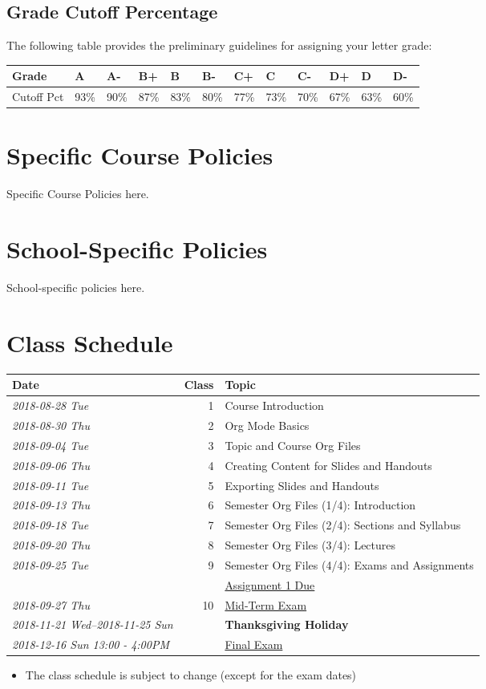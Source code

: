 \documentclass[article,letterpaper,times,10pt,listings-bw,microtype]{scrartcl}
\begin{document}
\subsection*{Grade Cutoff Percentage}
\label{sec:org087cdd8}
The following table provides the preliminary guidelines for assigning your
letter grade:

\begin{center}
\begin{tabular}{llllllllllll}
\hline
Grade & A & A- & B+ & B & B- & C+ & C & C- & D+ & D & D-\\
\hline
Cutoff Pct & 93\% & 90\% & 87\% & 83\% & 80\% & 77\% & 73\% & 70\% & 67\% & 63\% & 60\%\\
\hline
\end{tabular}
\end{center}
\section*{Specific Course Policies}
\label{sec:org88f7f98}
Specific Course Policies here.
\section*{School-Specific Policies}
\label{sec:org9fe0e92}
School-specific policies here.
\clearpage
\section*{Class Schedule}
\label{sec:org6cf35ec}
\begin{center}
\begin{tabular}{lrl}
Date & Class & Topic\\
\hline
\textit{2018-08-28 Tue} & 1 & Course Introduction\\
\textit{2018-08-30 Thu} & 2 & Org Mode Basics\\
\textit{2018-09-04 Tue} & 3 & Topic and Course Org Files\\
\textit{2018-09-06 Thu} & 4 & Creating Content for Slides and Handouts\\
\textit{2018-09-11 Tue} & 5 & Exporting Slides and Handouts\\
\textit{2018-09-13 Thu} & 6 & Semester Org Files (1/4): Introduction\\
\textit{2018-09-18 Tue} & 7 & Semester Org Files (2/4): Sections and Syllabus\\
\textit{2018-09-20 Thu} & 8 & Semester Org Files (3/4): Lectures\\
\textit{2018-09-25 Tue} & 9 & Semester Org Files (4/4): Exams and Assignments\\
 &  & \uline{Assignment 1 Due}\\
\textit{2018-09-27 Thu} & 10 & \uline{Mid-Term Exam}\\
\textit{2018-11-21 Wed--2018-11-25 Sun} &  & \textbf{Thanksgiving Holiday}\\
\textit{2018-12-16 Sun 13:00 } \emph{- 4:00PM} &  & \uline{Final Exam}\\
\end{tabular}
\end{center}

\begin{mdframed}[style=exampledefault, frametitle={Disclaimer}]
\begin{itemize}
\item The class schedule is subject to change (except for the exam dates)
\end{itemize}
\end{mdframed}
\end{document}
